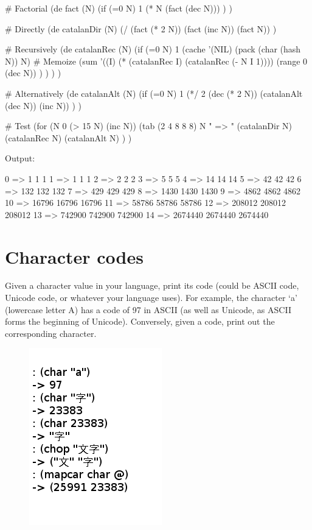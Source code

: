 \begin{wideverbatim}

# Factorial
(de fact (N)
   (if (=0 N)
      1
      (* N (fact (dec N))) ) )

# Directly
(de catalanDir (N)
   (/ (fact (* 2 N)) (fact (inc N)) (fact N)) )

# Recursively
(de catalanRec (N)
   (if (=0 N)
      1
      (cache '(NIL) (pack (char (hash N)) N)  # Memoize
         (sum
            '((I) (* (catalanRec I) (catalanRec (- N I 1))))
            (range 0 (dec N)) ) ) ) )

# Alternatively
(de catalanAlt (N)
   (if (=0 N)
      1
      (*/ 2 (dec (* 2 N)) (catalanAlt (dec N)) (inc N)) ) )

# Test
(for (N 0 (> 15 N) (inc N))
   (tab (2 4 8 8 8)
      N
      " => "
      (catalanDir N)
      (catalanRec N)
      (catalanAlt N) ) )

Output:

 0 =>        1       1       1
 1 =>        1       1       1
 2 =>        2       2       2
 3 =>        5       5       5
 4 =>       14      14      14
 5 =>       42      42      42
 6 =>      132     132     132
 7 =>      429     429     429
 8 =>     1430    1430    1430
 9 =>     4862    4862    4862
10 =>    16796   16796   16796
11 =>    58786   58786   58786
12 =>   208012  208012  208012
13 =>   742900  742900  742900
14 =>  2674440 2674440 2674440

\end{wideverbatim}

\pagebreak{}
\section*{Character codes}

Given a character value in your language, print its code (could be ASCII
code, Unicode code, or whatever your language uses). For example, the
character `a' (lowercase letter A) has a code of 97 in ASCII (as well as
Unicode, as ASCII forms the beginning of Unicode). Conversely, given a
code, print out the corresponding character.


\begin{figure}[H]
  \centering
  \includegraphics[scale=.6]{graphics/kanji.png}
\end{figure}

